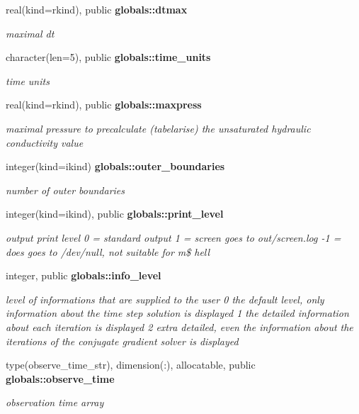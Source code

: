 \begin{DoxyCompactItemize}
real(kind=rkind), public {\bf globals\+::dtmax}
\begin{DoxyCompactList}\small\item\em maximal dt \end{DoxyCompactList}\item 
character(len=5), public {\bf globals\+::time\+\_\+units}
\begin{DoxyCompactList}\small\item\em time units \end{DoxyCompactList}\item 
real(kind=rkind), public {\bf globals\+::maxpress}
\begin{DoxyCompactList}\small\item\em maximal pressure to precalculate (tabelarise) the unsaturated hydraulic conductivity value \end{DoxyCompactList}\item 
integer(kind=ikind) {\bf globals\+::outer\+\_\+boundaries}
\begin{DoxyCompactList}\small\item\em number of outer boundaries \end{DoxyCompactList}\item 
integer(kind=ikind), public {\bf globals\+::print\+\_\+level}
\begin{DoxyCompactList}\small\item\em output print level 0 = standard output 1 = screen goes to out/screen.\+log -\/1 = does goes to /dev/null, not suitable for m\$ hell \end{DoxyCompactList}\item 
integer, public {\bf globals\+::info\+\_\+level}
\begin{DoxyCompactList}\small\item\em level of informations that are supplied to the user 0 the default level, only information about the time step solution is displayed 1 the detailed information about each iteration is displayed 2 extra detailed, even the information about the iterations of the conjugate gradient solver is displayed \end{DoxyCompactList}\item 
type(observe\+\_\+time\+\_\+str), dimension(\+:), allocatable, public {\bf globals\+::observe\+\_\+time}
\begin{DoxyCompactList}\small\item\em observation time array \end{DoxyCompactList}\item 

\end{DoxyCompactItemize}
